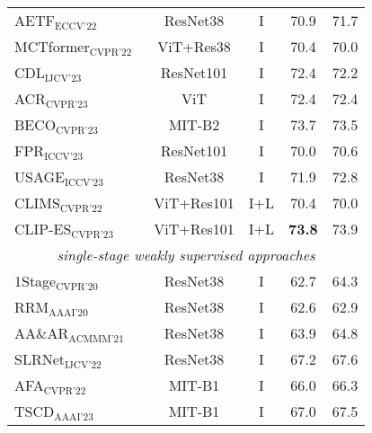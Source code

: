 \begin{table}[ht]
\begin{tabular}{l c c c c}
        AETF$_{\text{ECCV'22}}$~\cite{54}                                   & ResNet38   & I    & 70.9          & 71.7          \\
        MCTformer$_{\text{CVPR'22}}$~\cite{52}                              & ViT+Res38  & I    & 70.4          & 70.0          \\
        CDL$_{\text{IJCV'23}}$~\cite{58}                                    & ResNet101  & I    & 72.4          & 72.2          \\
        ACR$_{\text{CVPR'23}}$~\cite{22}                                    & ViT        & I    & 72.4          & 72.4          \\
        BECO$_{\text{CVPR'23}}$~\cite{37}                                   & MIT-B2     & I    & 73.7          & 73.5          \\
        FPR$_{\text{ICCV'23}}$~\cite{5}                                     & ResNet101  & I    & 70.0          & 70.6          \\
        USAGE$_{\text{ICCV'23}}$~\cite{35}                                  & ResNet38   & I    & 71.9          & 72.8          \\
        CLIMS$_{\text{CVPR'22}}$~\cite{51}                                  & ViT+Res101 & I+L  & 70.4          & 70.0          \\
        CLIP-ES$_{\text{CVPR'23}}$~\cite{29}                                & ViT+Res101 & I+L  & \textbf{73.8} & 73.9          \\
        \hline
        \multicolumn{5}{c}{\textit{single-stage weakly supervised approaches}}                                                  \\
        1Stage$_{\text{CVPR'20}}$~\cite{3}                                  & ResNet38   & I    & 62.7          & 64.3          \\
        RRM$_{\text{AAAI'20}}$~\cite{55}                                    & ResNet38   & I    & 62.6          & 62.9          \\
        AA\&AR$_{\text{ACMMM'21}}$~\cite{61}                                & ResNet38   & I    & 63.9          & 64.8          \\
        SLRNet$_{\text{IJCV'22}}$~\cite{34}                                 & ResNet38   & I    & 67.2          & 67.6          \\
        AFA$_{\text{CVPR'22}}$~\cite{39}                                    & MIT-B1     & I    & 66.0          & 66.3          \\
        TSCD$_{\text{AAAI'23}}$~\cite{53}                                   & MIT-B1     & I    & 67.0          & 67.5          \\

\end{tabular}
\end{table}
